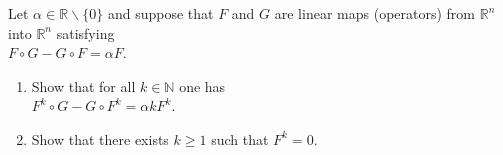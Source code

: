\documentclass{article}
\begin{document}
	\setlength{\parindent}{0pt}
	Let $\alpha\in\mathbb{R}\backslash\{0\}$ and suppose that $F$ and $G$ are linear maps (operators) from $\mathbb{R}^n$ into $\mathbb{R}^n$	satisfying\\
	$F\circ G - G \circ F =\alpha F$.
	\begin{enumerate}[label=\alph*)]
		\item Show that for all $k \in \mathbb{N}$ one has \\$
		F^k \circ G - G \circ F^k = \alpha kF^k$.
		\item Show that there exists $k \geq 1$ such that $F^k = 0$.
	\end{enumerate}
\end{document}
